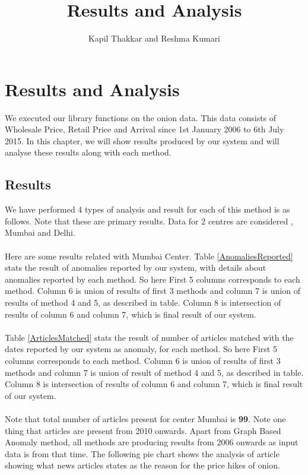 \documentclass[a4paper,10pt]{report}
\title{Results and Analysis}
\author{Kapil Thakkar and Reshma Kumari}
\begin{document}
\maketitle

\chapter{Results and Analysis}

We executed our library functions on the onion data. This data consists of 
Wholesale Price, Retail Price and Arrival since 1st January 2006 to 6th July 
2015. In this chapter, we will show results produced by our system and will 
analyse these results along with each method.

\section{Results}

We have performed 4 types of analysis and result for each of this method is as 
follows. Note that these are primary results. Data for 2 centres are considered 
, Mumbai and Delhi.\\
\\
Here are some results related with Mumbai Center. Table \ref{AnomaliesReported} stats the result of anomalies reported by our system, with details about anomalies reported by each method. So here First 5 columns corresponds to each method. Column 6 is union of results of first 3 methods and column 7 is union of results of method 4 and 5, as described in table. Column 8 is intersection of results of column 6 and column 7, which is final result of our system.\\
\\
Table \ref{ArticlesMatched} stats the result of number of articles matched with the dates reported by our system as anomaly, for each method. So here First 5 columns corresponds to each method. Column 6 is union of results of first 3 methods and column 7 is union of result of method 4 and 5, as described in table. Column 8 is intersection of results of column 6 and column 7, which is final result of our system.\\
\\
Note that total number of articles present for center Mumbai is \textbf{99}. Note one thing that articles are present from 2010 onwards. Apart from Graph Based Anomaly method, all methods are producing results from 2006 onwards as input data is from that time. The following pie chart shows the analysis of article showing what news articles states as the reason for the price hikes of onion.\\
\\
\end{document}

